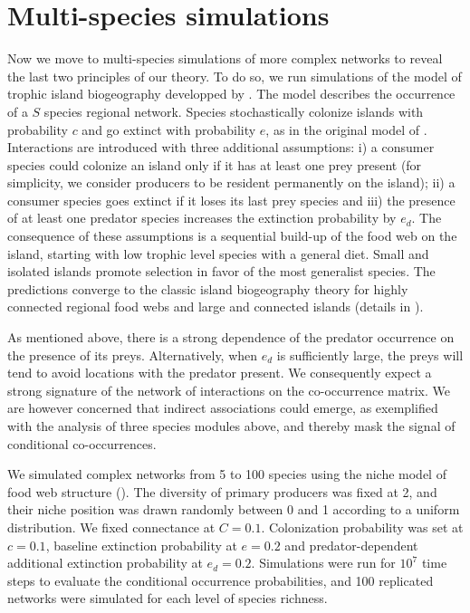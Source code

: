 \section*{Multi-species simulations}
\label{multi}

Now we move to multi-species simulations of more complex networks to reveal the
last two principles of our theory. To do so, we run simulations of the model of
trophic island biogeography developped by \cite{Gravel2011Trophic}. The model
describes the occurrence of a $S$ species regional network. Species stochastically
colonize islands with probability $c$ and go extinct with probability $e$, as in
the original model of \cite{Macarthur1967Theory}. Interactions are introduced with
three additional assumptions: i) a consumer species could colonize an island
only if it has at least one prey present (for simplicity, we consider producers
to be resident permanently on the island); ii) a consumer species goes extinct
if it loses its last prey species and iii) the presence of at least one predator
species increases the extinction probability by $e_d$. The consequence of these
assumptions is a sequential build-up of the food web on the island, starting
with low trophic level species with a general diet. Small and isolated islands
promote selection in favor of the most generalist species. The predictions
converge to the classic island biogeography theory for highly connected regional
food webs and large and connected islands (details in \citealt{Gravel2011Trophic}).

As mentioned above, there is a strong dependence of the predator
occurrence on the presence of its preys. Alternatively, when $e_d$ is
sufficiently large, the preys will tend to avoid locations with the predator
present. We consequently expect a strong signature of the network of
interactions on the co-occurrence matrix. We are however concerned that
indirect associations could emerge, as exemplified with the analysis of three
species modules above, and thereby mask the signal of conditional co-occurrences.

We simulated complex networks from 5 to 100 species using the niche model of
food web structure (\citealt{Williams2000Simple}). The diversity of primary
producers was fixed at 2, and their niche position was drawn randomly between
0 and 1 according to a uniform distribution. We fixed connectance at $C =
0.1$. Colonization probability was set at $c = 0.1$, baseline extinction
probability at $e = 0.2$ and predator-dependent additional extinction
probability at $e_d = 0.2$. Simulations were run for $10^7$ time steps to
evaluate the conditional occurrence probabilities, and 100 replicated networks
were simulated for each level of species richness.

